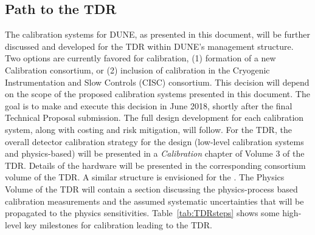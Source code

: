 

\subsection{Path to the TDR}
\label{sec:TDR}
The calibration systems for DUNE, as presented in this document, will be further discussed and developed for the TDR within DUNE's management %
structure. Two options are currently favored for %
calibration, (1) formation of a new Calibration consortium, or (2) inclusion of calibration in the Cryogenic Instrumentation and Slow Controls (CISC) consortium. This decision will depend on the scope of the proposed calibration systems presented in this document. The goal is to make and execute this decision in June 2018, shortly after the final Technical Proposal submission. %
The full design development for each calibration system, along with costing and risk mitigation, will follow. %
For the TDR, the overall detector calibration strategy for the  design (low-level calibration systems and physics-based) will be presented in a \textit{Calibration} chapter of Volume 3 of the TDR. Details of the hardware will be presented in the corresponding consortium volume of the TDR. A similar structure is envisioned for the . %
The Physics Volume of the TDR will contain a section discussing the physics-process based calibration measurements and the assumed systematic uncertainties that will be propagated to the physics sensitivities. Table~\ref{tab:TDRsteps} shows some high-level key milestones for calibration leading to the TDR.

